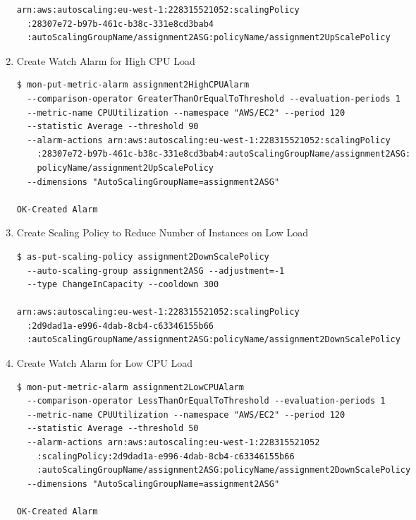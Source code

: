 \documentclass{article}
\begin{document}
\begin{enumerate}
\begin{verbatim}
arn:aws:autoscaling:eu-west-1:228315521052:scalingPolicy
  :28307e72-b97b-461c-b38c-331e8cd3bab4
  :autoScalingGroupName/assignment2ASG:policyName/assignment2UpScalePolicy
\end{verbatim}

	\item Create Watch Alarm for High CPU Load
\begin{verbatim}
$ mon-put-metric-alarm assignment2HighCPUAlarm 
  --comparison-operator GreaterThanOrEqualToThreshold --evaluation-periods 1 
  --metric-name CPUUtilization --namespace "AWS/EC2" --period 120 
  --statistic Average --threshold 90 
  --alarm-actions arn:aws:autoscaling:eu-west-1:228315521052:scalingPolicy
    :28307e72-b97b-461c-b38c-331e8cd3bab4:autoScalingGroupName/assignment2ASG:
    policyName/assignment2UpScalePolicy 
  --dimensions "AutoScalingGroupName=assignment2ASG"

OK-Created Alarm
\end{verbatim}

	\item Create Scaling Policy to Reduce Number of Instances on Low Load
\begin{verbatim}
$ as-put-scaling-policy assignment2DownScalePolicy 
  --auto-scaling-group assignment2ASG --adjustment=-1 
  --type ChangeInCapacity --cooldown 300

arn:aws:autoscaling:eu-west-1:228315521052:scalingPolicy
  :2d9dad1a-e996-4dab-8cb4-c63346155b66
  :autoScalingGroupName/assignment2ASG:policyName/assignment2DownScalePolicy
\end{verbatim}

	\item Create Watch Alarm for Low CPU Load
\begin{verbatim}
$ mon-put-metric-alarm assignment2LowCPUAlarm 
  --comparison-operator LessThanOrEqualToThreshold --evaluation-periods 1 
  --metric-name CPUUtilization --namespace "AWS/EC2" --period 120 
  --statistic Average --threshold 50 
  --alarm-actions arn:aws:autoscaling:eu-west-1:228315521052
    :scalingPolicy:2d9dad1a-e996-4dab-8cb4-c63346155b66
    :autoScalingGroupName/assignment2ASG:policyName/assignment2DownScalePolicy 
  --dimensions "AutoScalingGroupName=assignment2ASG"

OK-Created Alarm
\end{verbatim}
\end{enumerate}

\setcounter{section}{2}
\end{document}

